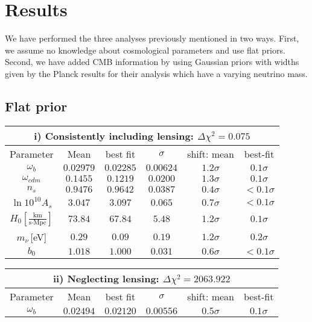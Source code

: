 \section{Results}
\label{chapter:7:results}

We have performed the three analyses previously mentioned in two ways. First, we assume no knowledge about cosmological parameters and use flat priors. Second, we have added CMB information by using Gaussian priors with widths given by the Planck results for their analysis which have a varying neutrino mass. 

\subsection{Flat prior}

\begin{table}[!t]
\centering
\begin{tabular}{@{}cccccc}
\hline
\multicolumn{6}{c}{i) Consistently including lensing: $\Delta \chi^2 = 0.075$} \\
\hline
Parameter & Mean & best fit & $\sigma$ &\hspace{-0.52cm} shift: mean & best-fit \\
\hline
$\omega_b$ & $0.02979$ & $0.02285 $ &$0.00624 $ &  \quad$1.2\sigma$ & $ 0.1\sigma$ \\
$\omega_{cdm}$ & $0.1455 $ & $0.1219 $ & \quad$0.0200 $ &  \quad$1.3\sigma$ & $0.1\sigma$ \\
$n_s$      & $0.9476 $ & $0.9642 $ & $0.0387 $ &  \quad$0.4\sigma$ & $ <0.1\sigma$ \\
$\ln10^{10}A_s$ & $3.047 $ & $3.097$ & $0.065 $ &  \quad$0.7\sigma$ & $ <0.1\sigma$ \\
$H_0\left[\frac{\text{km}}{\text{s}\cdot\text{Mpc}}\right]$      & $73.84$ & $67.84$ & $5.48$ &  \quad$1.2\sigma$ & $ 0.1\sigma$ \\
$m_{\nu}$\,[eV]  & $0.29$ & $0.09$ & $0.19$ & \quad $ 1.2\sigma$ & $ 0.2\sigma$ \\
$b_0$ & $1.018$ & $1.000$ & $0.031$ & $0.6\sigma$ & $<0.1\sigma$ \\
\end{tabular}
\begin{tabular}{@{}cccccc}
\hline
\multicolumn{6}{c}{ii) Neglecting lensing: $\Delta \chi^2 = 2063.922$} \\
\hline
Parameter & Mean & best fit & $\sigma$ & \hspace{-0.52cm} shift: mean & best-fit \\
\hline
$\omega_b$ & $0.02494$ & $0.02120 $ & $0.00556 $ &  \quad$0.5\sigma$ & $0.1\sigma$ \\

\end{tabular}
\end{table}
